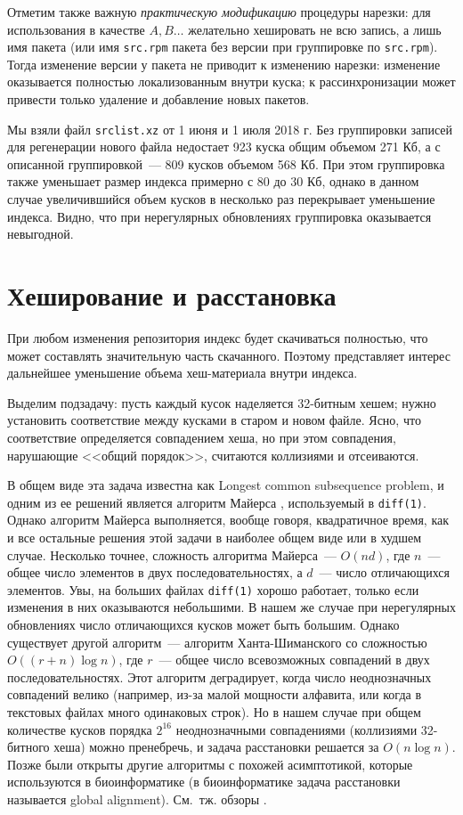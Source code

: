 \documentclass[russian,a4paper,12pt]{article}
\begin{document}
Отметим также важную \textit{практическую модификацию} процедуры нарезки: для использования в качестве $A, B\ldots$
желательно хешировать не всю запись, а лишь имя пакета (или имя \verb|src.rpm| пакета без версии при группировке по \verb|src.rpm|).
Тогда изменение версии у пакета не приводит к изменению нарезки: изменение оказывается полностью локализованным внутри куска;
к рассинхронизации может привести только удаление и добавление новых пакетов.

Мы взяли файл \verb|srclist.xz| от 1 июня и 1 июля 2018 г.  Без группировки записей для регенерации нового файла
недостает 923 куска общим объемом 271 Кб, а с описанной группировкой~--- 809 кусков объемом 568 Кб.  При этом группировка
также уменьшает размер индекса примерно с 80 до 30 Кб, однако в данном случае увеличившийся объем кусков в несколько
раз перекрывает уменьшение индекса.  Видно, что при нерегулярных обновлениях группировка оказывается невыгодной.

\section{Хеширование и расстановка}
При любом изменения репозитория индекс будет скачиваться полностью, что может составлять значительную часть скачанного.
Поэтому представляет интерес дальнейшее уменьшение объема хеш-материала внутри индекса.

Выделим подзадачу: пусть каждый кусок наделяется 32-битным хешем; нужно установить соответствие между кусками в старом
и новом файле.  Ясно, что соответствие определяется совпадением хеша, но при этом совпадения, нарушающие <<общий порядок>>,
считаются коллизиями и отсеиваются.

В общем виде эта задача известна как Longest common subsequence problem, и одним из ее решений является алгоритм Майерса
\cite{myers}, используемый в \verb|diff(1)|.  Однако алгоритм Майерса выполняется, вообще говоря, квадратичное время,
как и все остальные решения этой задачи в наиболее общем виде или в худшем случае.  Несколько точнее, сложность алгоритма Майерса~---
$O(nd)$, где $n$~--- общее число элементов в двух последовательностях, а $d$~--- число отличающихся элементов.
Увы, на больших файлах \verb|diff(1)| хорошо работает, только если изменения в них оказываются небольшими.
В нашем же случае при нерегулярных обновлениях число отличающихся кусков может быть большим.
Однако существует другой алгоритм~--- алгоритм Ханта-Шиманского со сложностью $O((r+n)\log n)$, где $r$~--- общее число
всевозможных совпадений в двух последовательностях.  Этот алгоритм деградирует, когда число неоднозначных совпадений велико
(например, из-за малой мощности алфавита, или когда в текстовых файлах много одинаковых строк).  Но в нашем случае при общем
количестве кусков порядка $2^{16}$ неоднозначными совпадениями (коллизиями 32-битного хеша) можно пренебречь, и задача расстановки
решается за $O(n\log n)$.  Позже были открыты другие алгоритмы с похожей асимптотикой, которые используются в биоинформатике
\cite[с.\,291]{seq} (в биоинформатике задача расстановки называется global alignment).  См.~тж. обзоры \cite{survey,symposium}.
\end{document}

